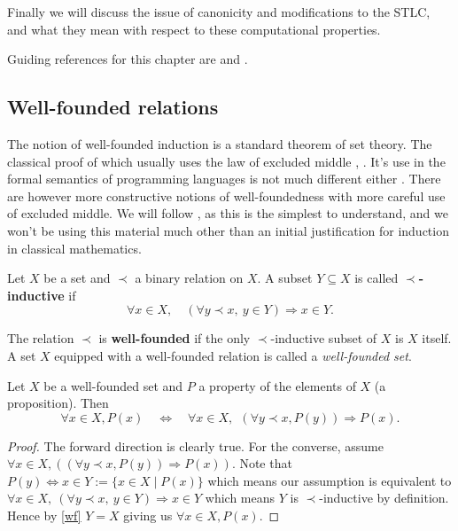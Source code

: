 Finally we will discuss the issue of canonicity and modifications to the STLC, and what they mean with respect to these computational properties.

Guiding references for this chapter are \cite{Sorensen} and \cite{BarendregtHenk2013Lcwt}.

\subsection{Well-founded relations}

The notion of well-founded induction is a standard theorem of set theory. The classical proof of which usually uses the law of excluded middle \cite[p. 62]{johnstone1987notes}, \cite[Ch. 7]{barwise1982handbook}. It's use in the formal semantics of programming languages is not much different either \cite[Ch. 3]{winskel1993formal}. There are however more constructive notions of well-foundedness \cite[\S 8]{2018arXiv180805204S} with more careful use of excluded middle. We will follow \cite{10.2307/2275781}, as this is the simplest to understand, and we won't be using this material much other than an initial justification for induction in classical mathematics.

\begin{defin}
    Let $X$ be a set and $\prec$ a binary relation on $X$. A subset $Y \subseteq X$ is called \textbf{$\prec$-inductive} if
    $$
        \forall x \in X, \quad (\forall y \prec x,\ y \in Y) \Rightarrow x \in Y.
    $$
\end{defin}

\begin{defin}\label{wf}
    The relation $\prec$ is \textbf{well-founded} if the only $\prec$-inductive subset of $X$ is $X$ itself. A set $X$ equipped with a well-founded relation is called a \textit{well-founded set}.
\end{defin}

\begin{theorem}
    Let $X$ be a well-founded set and $P$ a property of the elements of $X$ (a proposition). Then
    $$
        \forall x \in X, P(x) \quad \iff \quad  \forall x \in X,\ \ (\forall y \prec x, P(y)) \Rightarrow P(x).
    $$
\end{theorem}

\begin{proof}
    The forward direction is clearly true. For the converse, assume $\forall x \in X,((\forall y \prec x, P(y)) \Rightarrow P(x))$. Note that $P(y) \Leftrightarrow x \in Y := \{ x \in X \mid P(x)\} $ which means our assumption is equivalent to $\forall x \in X,\ (\forall y \prec x,\ y \in Y) \Rightarrow x \in Y$ which means $Y$ is $\prec$-inductive by definition. Hence by \ref{wf} $Y=X$ giving us $ \forall x \in X, P(x)$.
\end{proof}

